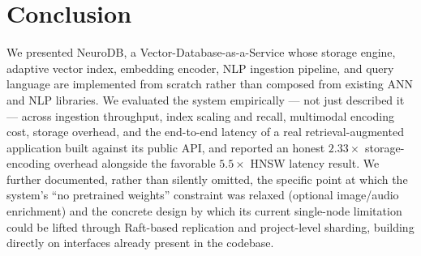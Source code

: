 \documentclass[conference]{IEEEtran}
\begin{document}
\section{Conclusion}

We presented NeuroDB, a Vector-Database-as-a-Service whose storage engine, adaptive vector
index, embedding encoder, NLP ingestion pipeline, and query language are implemented from
scratch rather than composed from existing ANN and NLP libraries. We evaluated the system
empirically --- not just described it --- across ingestion throughput, index scaling and
recall, multimodal encoding cost, storage overhead, and the end-to-end latency of a real
retrieval-augmented application built against its public API, and reported an honest
$2.33\times$ storage-encoding overhead alongside the favorable $5.5\times$ HNSW latency
result. We further documented, rather than silently omitted, the specific point at which the
system's ``no pretrained weights'' constraint was relaxed (optional image/audio enrichment)
and the concrete design by which its current single-node limitation could be lifted through
Raft-based replication and project-level sharding, building directly on interfaces already
present in the codebase.
\end{document}
